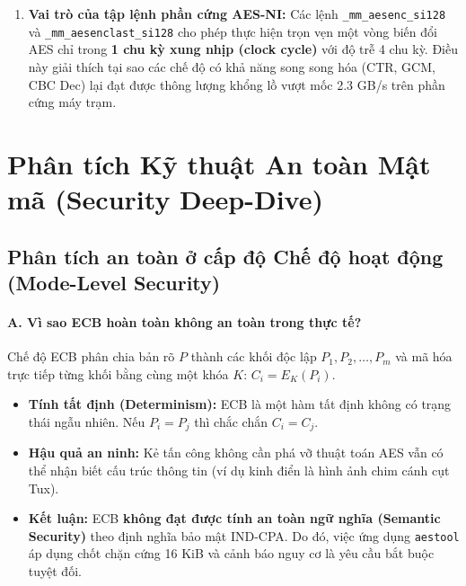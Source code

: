 \documentclass[12pt, a4paper]{report}
\begin{document}
\begin{enumerate}
\begin{itemize}
    \end{itemize}
    \item \textbf{Vai trò của tập lệnh phần cứng AES-NI:} Các lệnh \texttt{\_mm\_aesenc\_si128} và \texttt{\_mm\_aesenclast\_si128} cho phép thực hiện trọn vẹn một vòng biến đổi AES chỉ trong \textbf{1 chu kỳ xung nhịp (clock cycle)} với độ trễ 4 chu kỳ. Điều này giải thích tại sao các chế độ có khả năng song song hóa (CTR, GCM, CBC Dec) lại đạt được thông lượng khổng lồ vượt mốc 2.3 GB/s trên phần cứng máy trạm.
\end{enumerate}

\section{Phân tích Kỹ thuật An toàn Mật mã (Security Deep-Dive)}
\label{sec:security-analysis}

\subsection{Phân tích an toàn ở cấp độ Chế độ hoạt động (Mode-Level Security)}

\paragraph{A. Vì sao ECB hoàn toàn không an toàn trong thực tế?}
Chế độ ECB phân chia bản rõ $P$ thành các khối độc lập $P_1, P_2, \dots, P_m$ và mã hóa trực tiếp từng khối bằng cùng một khóa $K$: $C_i = E_K(P_i)$.
\begin{itemize}
    \item \textbf{Tính tất định (Determinism):} ECB là một hàm tất định không có trạng thái ngẫu nhiên. Nếu $P_i = P_j$ thì chắc chắn $C_i = C_j$.
    \item \textbf{Hậu quả an ninh:} Kẻ tấn công không cần phá vỡ thuật toán AES vẫn có thể nhận biết cấu trúc thông tin (ví dụ kinh điển là hình ảnh chim cánh cụt Tux).
    \item \textbf{Kết luận:} ECB \textbf{không đạt được tính an toàn ngữ nghĩa (Semantic Security)} theo định nghĩa bảo mật IND-CPA. Do đó, việc ứng dụng \texttt{aestool} áp dụng chốt chặn cứng 16 KiB và cảnh báo nguy cơ là yêu cầu bắt buộc tuyệt đối.
\end{itemize}
\end{document}
